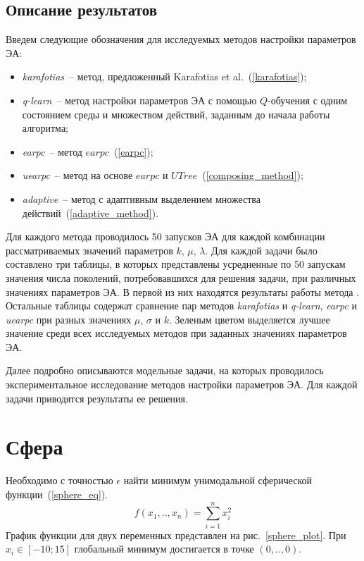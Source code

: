 \subsection{Описание результатов}

Введем следующие обозначения для исследуемых методов настройки параметров ЭА:
\begin{itemize}
 \item \textit{karafotias}~-- метод, предложенный Karafotias et al.~(\ref{karafotias});
 \item \textit{q-learn}~-- метод настройки параметров ЭА с помощью $Q$-обучения с одним состоянием среды и множеством действий, заданным до начала работы алгоритма;
 \item \textit{earpc}~-- метод $earpc$~(\ref{earpc});
 \item \textit{uearpc}~-- метод на основе $earpc$ и $UTree$~(\ref{composing_method});
 \item \textit{adaptive}~-- метод с адаптивным выделением множества действий~(\ref{adaptive_method}).
\end{itemize}

Для каждого метода проводилось 50 запусков ЭА для каждой комбинации рассматриваемых значений параметров $k$, $\mu$, $\lambda$. Для каждой задачи было составлено три таблицы, в которых представлены усредненные по 50 запускам значения числа поколений, потребовавшихся для решения задачи, при различных значениях параметров ЭА. В первой из них находятся результаты работы метода . Остальные таблицы содержат сравнение пар методов \textit{karafotias} и \textit{q-learn}, \textit{earpc} и \textit{uearpc} при разных значениях $\mu$, $\sigma$ и $k$. Зеленым цветом выделяется лучшее значение среди всех исследуемых методов при заданных значениях параметров ЭА.
 
Далее подробно описываются модельные задачи, на которых проводилось экспериментальное исследование методов настройки параметров ЭА. Для каждой задачи приводятся результаты ее решения.
 
\section{Сфера}

Необходимо с точностью $\epsilon$ найти минимум унимодальной сферической функции~(\ref{sphere_eq}).
\begin{equation}
\label{sphere_eq}
f(x_1,..,x_n) = \sum\limits_{i=1}^n{x_i^2}
\end{equation}
График функции для двух переменных представлен на рис.~\ref{sphere_plot}. При $x_i \in [-10; 15]$ глобальный минимум достигается в точке $(0,..,0)$.

